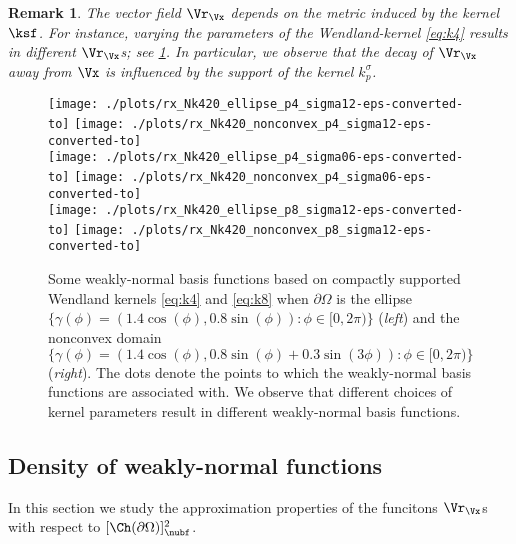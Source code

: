 \documentclass{siamart1116}
\newtheorem{remark}[theorem]{Remark}
\numberwithin{theorem}{section}
\begin{document}
\begin{remark}
The vector field $\Vr_\Vx$ depends on the metric induced by the kernel $\ksf$. For instance,
varying the parameters of the Wendland-kernel \cref{eq:k4} results in different $\Vr_\Vx$s; see \cref{fig:plotrx}.
In particular, we observe that the decay of $\Vr_\Vx$ away from $\Vx$ is influenced by the support of the
kernel $k_p^\sigma$.
\end{remark}

\begin{figure}[htb!]
\texttt{[image: ./plots/rx\_Nk420\_ellipse\_p4\_sigma12-eps-converted-to]}
\hfill
\texttt{[image: ./plots/rx\_Nk420\_nonconvex\_p4\_sigma12-eps-converted-to]}\\
\texttt{[image: ./plots/rx\_Nk420\_ellipse\_p4\_sigma06-eps-converted-to]}
\hfill
\texttt{[image: ./plots/rx\_Nk420\_nonconvex\_p4\_sigma06-eps-converted-to]}\\
\texttt{[image: ./plots/rx\_Nk420\_ellipse\_p8\_sigma12-eps-converted-to]}
\hfill
\texttt{[image: ./plots/rx\_Nk420\_nonconvex\_p8\_sigma12-eps-converted-to]}
\caption{Some weakly-normal basis functions based on compactly supported
Wendland kernels \cref{eq:k4} and  \cref{eq:k8} when $\partial\Omega$ is
the ellipse $\{ \gamma(\phi) = (1.4\cos(\phi), 0.8\sin(\phi)): \phi\in[0, 2\pi)\}$ (\emph{left})
and the nonconvex domain
$\{ \gamma(\phi) =(1.4\cos(\phi), 0.8\sin(\phi) + 0.3\sin(3\phi)): \phi\in[0, 2\pi)\}$
(\emph{right}). The dots denote the points to which the weakly-normal basis functions
are associated with.
We observe that different choices of kernel parameters result in different weakly-normal
basis functions.}
\label{fig:plotrx}
\end{figure}

\subsection{Density of weakly-normal functions}
In this section we study the approximation properties of the funcitons
$\Vr_\Vx$s with respect to $[\Ch(\partial \Omega)]^2_{\nubf}$.
\end{document}
